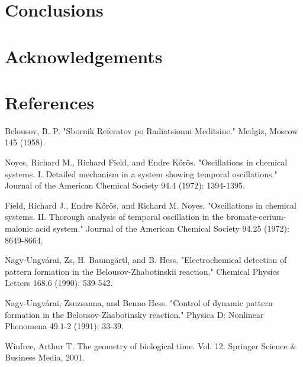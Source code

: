 \documentclass[3p, twocolumn]{elsarticle}
\begin{document}
\section{Conclusions}

\section*{Acknowledgements}

\section*{References}

\begin{thebibliography}{5}
 Belousov, B. P. "Sbornik Referatov po Radiatsionni Meditsine." Medgiz, Moscow 145 (1958).

 Noyes, Richard M., Richard Field, and Endre Kőrös. "Oscillations in chemical systems. I. Detailed mechanism in a system showing temporal oscillations." Journal of the American Chemical Society 94.4 (1972): 1394-1395.

 Field, Richard J., Endre Kőrös, and Richard M. Noyes. "Oscillations in chemical systems. II. Thorough analysis of temporal oscillation in the bromate-cerium-malonic acid system." Journal of the American Chemical Society 94.25 (1972): 8649-8664.


Nagy-Ungvárai, Zs, H. Baumgärtl, and B. Hess. "Electrochemical detection of pattern formation in the Belousov-Zhabotinskii reaction." Chemical Physics Letters 168.6 (1990): 539-542. 

Nagy-Ungvárai, Zsuzsanna, and Benno Hess. "Control of dynamic pattern formation in the Belousov-Zhabotinsky reaction." Physica D: Nonlinear Phenomena 49.1-2 (1991): 33-39.

 Winfree, Arthur T. The geometry of biological time. Vol. 12. Springer Science \& Business Media, 2001.

\end{thebibliography}
\end{document}
